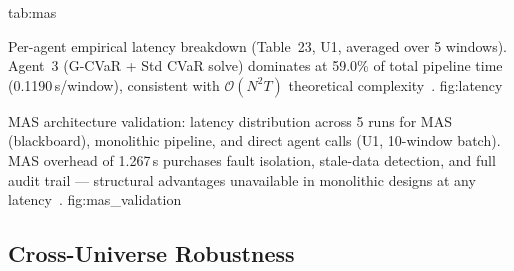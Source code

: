   {tab:mas}
  {}

  {Per-agent empirical latency breakdown (Table~23, U1, averaged
   over 5 windows). Agent~3 (G-CVaR + Std CVaR solve) dominates
   at 59.0\% of total pipeline time (0.1190\,s/window), consistent
   with $\mathcal{O}(N^2 T)$ theoretical complexity~\citep{rockafellar2000,diamond2016}.}
  {fig:latency}

  {MAS architecture validation: latency distribution across 5 runs
   for MAS (blackboard), monolithic pipeline, and direct agent calls
   (U1, 10-window batch). MAS overhead of 1.267\,s purchases fault
   isolation, stale-data detection, and full audit trail — structural
   advantages unavailable in monolithic designs at any
   latency~\citep{hayesroth1985,erman1980,mifid2014}.}
  {fig:mas_validation}

\subsection{Cross-Universe Robustness}

